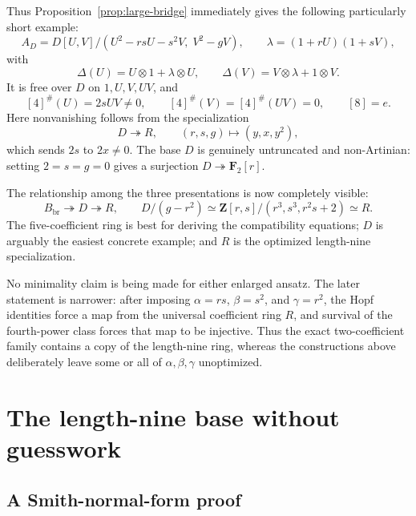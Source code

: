 \documentclass[11pt]{article}
\theoremstyle{remark}
\newcommand{\Z}{\mathbf Z}
\newcommand{\F}{\mathbf F}
\newcommand{\ot}{\otimes}
\begin{document}
Thus Proposition~\ref{prop:large-bridge} immediately gives the following
particularly short example:
\begin{equation}\label{eq:three-coefficient-A}
 A_D=D[U,V]/(U^2-rsU-s^2V,\;V^2-gV),
 \qquad \lambda=(1+rU)(1+sV),
\end{equation}
with
\begin{equation}\label{eq:three-coefficient-Delta}
 \Delta(U)=U\ot1+\lambda\ot U,
 \qquad
 \Delta(V)=V\ot\lambda+1\ot V.
\end{equation}
It is free over $D$ on $1,U,V,UV$, and
\begin{equation}\label{eq:three-coefficient-powers}
 [4]^\#(U)=2sUV\ne0,
 \qquad [4]^\#(V)=[4]^\#(UV)=0,
 \qquad [8]=e.
\end{equation}
Here nonvanishing follows from the specialization
\[
 D\twoheadrightarrow R,
 \qquad (r,s,g)\longmapsto(y,x,y^2),
\]
which sends $2s$ to $2x\ne0$.  The base $D$ is genuinely untruncated and
non-Artinian: setting $2=s=g=0$ gives a surjection
$D\twoheadrightarrow\F_2[r]$.

The relationship among the three presentations is now completely visible:
\[
 B_{\mathrm{br}}\twoheadrightarrow D\twoheadrightarrow R,
 \qquad
 D/(g-r^2)\simeq
 \Z[r,s]/(r^3,s^3,r^2s+2)\simeq R.
\]
The five-coefficient ring is best for deriving the compatibility equations;
$D$ is arguably the easiest concrete example; and $R$ is the optimized
length-nine specialization.

No minimality claim is being made for either enlarged ansatz.  The later
statement is narrower: after imposing
$\alpha=rs$, $\beta=s^2$, and $\gamma=r^2$, the Hopf identities force a map
from the universal coefficient ring $R$, and survival of the fourth-power
class forces that map to be injective.  Thus the exact two-coefficient
family contains a copy of the length-nine ring, whereas the constructions
above deliberately leave some or all of $\alpha,\beta,\gamma$ unoptimized.

\section{The length-nine base without guesswork}

\subsection{A Smith-normal-form proof}
\end{document}
